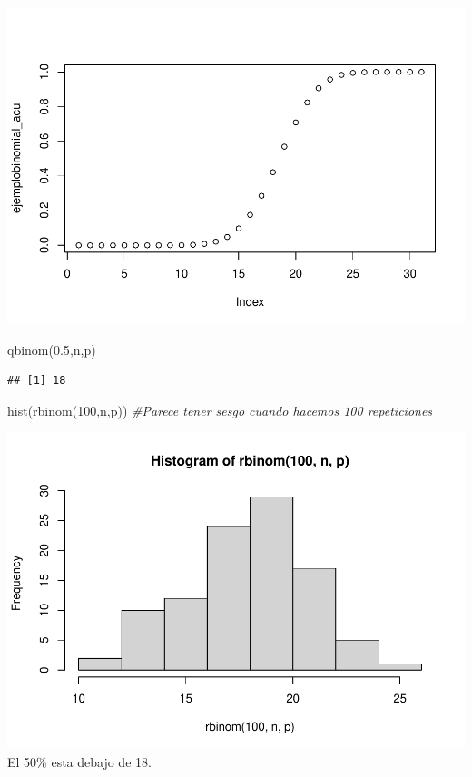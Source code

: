\documentclass[
]{article}
\newenvironment{Shaded}{\begin{snugshade}}{\end{snugshade}}
\newcommand{\CommentTok}[1]{\textcolor[rgb]{0.56,0.35,0.01}{\textit{#1}}}
\newcommand{\DecValTok}[1]{\textcolor[rgb]{0.00,0.00,0.81}{#1}}
\newcommand{\FloatTok}[1]{\textcolor[rgb]{0.00,0.00,0.81}{#1}}
\newcommand{\FunctionTok}[1]{\textcolor[rgb]{0.00,0.00,0.00}{#1}}
\newcommand{\NormalTok}[1]{#1}
\begin{document}
\includegraphics{Teoria4_files/figure-latex/unnamed-chunk-2-2.pdf}

\begin{Shaded}
\begin{Highlighting}[]
\FunctionTok{qbinom}\NormalTok{(}\FloatTok{0.5}\NormalTok{,n,p)}
\end{Highlighting}
\end{Shaded}

\begin{verbatim}
## [1] 18
\end{verbatim}

\begin{Shaded}
\begin{Highlighting}[]
\FunctionTok{hist}\NormalTok{(}\FunctionTok{rbinom}\NormalTok{(}\DecValTok{100}\NormalTok{,n,p)) }\CommentTok{\#Parece tener sesgo cuando hacemos 100 repeticiones}
\end{Highlighting}
\end{Shaded}

\includegraphics{Teoria4_files/figure-latex/unnamed-chunk-2-3.pdf} El
50\% esta debajo de 18.
\end{document}
